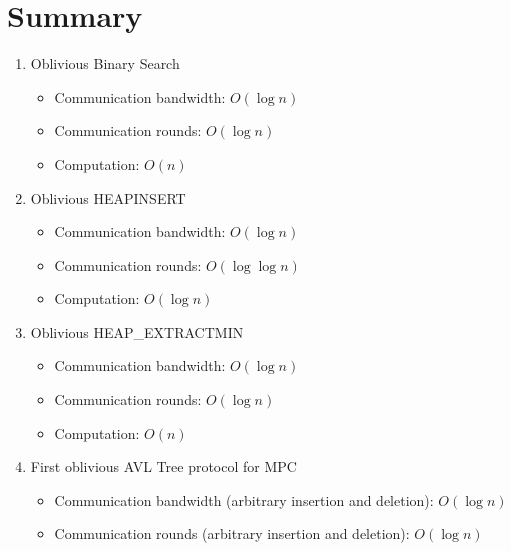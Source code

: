 
\clearpage
{}

%
\setcounter{section}{0} %

\section{Summary}
\begin{enumerate}
   \item Oblivious Binary Search
    \begin{itemize}
        \item Communication bandwidth: $O(\log n)$
        \item Communication rounds: $O(\log n)$
        \item Computation: $O(n)$
    \end{itemize}
   \item Oblivious HEAPINSERT
    \begin{itemize}
        \item Communication bandwidth: $O(\log n)$
        \item Communication rounds: $O(\log \log n)$
        \item Computation: $O(\log n)$
    \end{itemize}
   \item Oblivious HEAP\_EXTRACTMIN
    \begin{itemize}
        \item Communication bandwidth: $O(\log n)$
        \item Communication rounds: $O(\log n)$
        \item Computation: $O(n)$
    \end{itemize}
    \item First oblivious AVL Tree protocol for MPC
    \begin{itemize}
        \item Communication bandwidth (arbitrary insertion and deletion): $O(\log n)$
        \item Communication rounds (arbitrary insertion and deletion): $O(\log n)$
    \end{itemize}
\end{enumerate}

